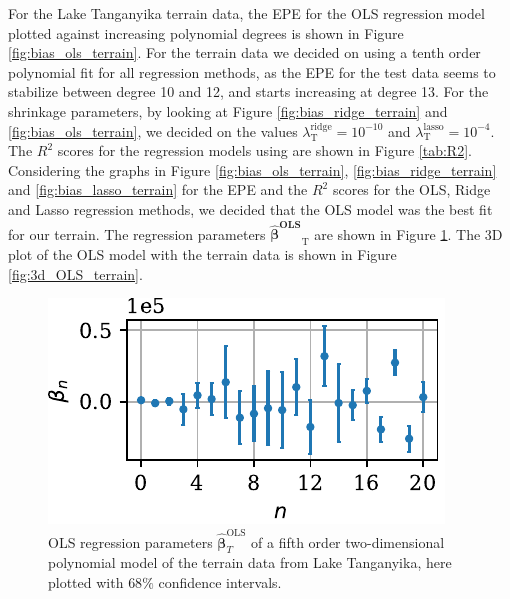 \documentclass[a4paper, 10pt]{article}
\begin{document}
\begin{multicols}{2}
\noindent
For the Lake Tanganyika  terrain data, the EPE for the OLS regression model plotted against increasing polynomial degrees is shown in Figure \ref{fig:bias_ols_terrain}. For the terrain data we decided on using a tenth order polynomial fit for all regression methods, as the EPE for the test data seems to stabilize between degree 10 and 12, and starts increasing at degree 13.  For the shrinkage parameters, by looking at Figure \ref{fig:bias_ridge_terrain} and \ref{fig:bias_ols_terrain}, we decided on the values  $\lambda^\text{ridge}_\text{T}=10^{-10} $ and $\lambda^\text{lasso}_\text{T}=10^{-4} $. 
The $R^2$ scores for the regression models using are shown in Figure \ref{tab:R2}. Considering the graphs in Figure \ref{fig:bias_ols_terrain}, \ref{fig:bias_ridge_terrain} and \ref{fig:bias_lasso_terrain} for the EPE  and the $R^2$ scores for the OLS, Ridge and Lasso regression methods, we decided that the OLS model was the best fit for our terrain.  The regression parameters $\bm{\hat{\beta}^\text{OLS}}_\text{T}$ are shown in Figure \ref{fig:beta_variance_terrain}. The 3D plot of the OLS model with the terrain data is shown in Figure \ref{fig:3d_OLS_terrain}.

\begin{figure}[H]
    \includegraphics[scale=1]{figs/beta_variance_ols_terrain.pdf}
    \caption{OLS regression parameters $\bm{\hat{\beta}}^{\text{OLS}}_T$  of a fifth order two-dimensional polynomial model  of the terrain data from Lake Tanganyika, here plotted with $68\%$ confidence intervals.}
    \label{fig:beta_variance_terrain}
\end{figure}

\end{multicols}
\end{document}
